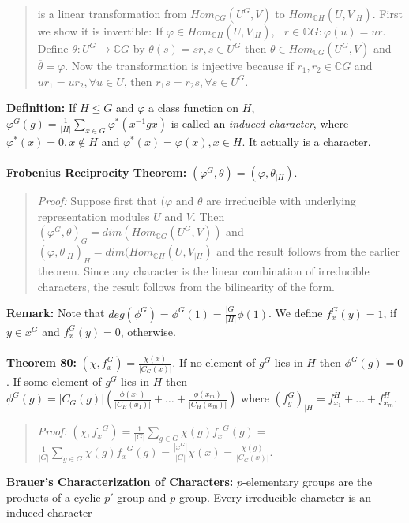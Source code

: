 {\begin{quote}
is a linear transformation from
$ Hom_{{\mathbb C}G}(U^G, V)$ to $Hom_{{\mathbb C}H}(U, V_{|H})$.  First we show it
is invertible: 
If $\varphi \in Hom_{{\mathbb C}H}(U, V_{|H})$,
$\exists r \in {\mathbb C}G: \varphi(u)= ur$.  Define $\theta: U^G \rightarrow {\mathbb C}G$
by $\theta(s)= sr, s \in U^G$ then
$\theta \in Hom_{{\mathbb C}G}(U^G, V) $ and ${\overline \theta}= \varphi$.  Now
the transformation is injective because if
$r_1 , r_2 \in {\mathbb C}G$ and  $u r_1 = u r_2, \forall u \in U$, then
$r_1 s = r_2 s, \forall s \in U^G$.
\end{quote}
{\bf Definition:}
If $H \le G$ and $\varphi$ a class function on $H$, 
$\varphi^G(g)= {\frac 1 {|H|}} \sum_{x \in G} \varphi^* (x^{-1}gx)$ is called an
\emph{induced character}, where $\varphi^*(x)= 0, x \notin H$ and
$\varphi^*(x)= \varphi(x), x \in H$.  It actually is a character.
\\
\\
{\bf Frobenius Reciprocity Theorem:} 
$(\varphi^G , \theta)= (\varphi, \theta_{|H})$.
\begin{quote}
\emph{Proof:}  
Suppose first that 
$(\varphi$ and $\theta$ are irreducible with underlying representation modules
$U$ and $V$.  Then
$(\varphi^G , \theta)_G = dim(Hom_{{\mathbb C}G}(U^G, V))$ and
$(\varphi , \theta_{|H})_H = dim(Hom_{{\mathbb C}H}(U, V_{|H})$ and the result follows from
the earlier theorem.  Since any character is the linear combination of irreducible characters,
the result follows from the bilinearity of the form.
\end{quote}
{\bf Remark:}  Note that $deg(\phi^G)= \phi^G(1)= {\frac {|G|} {|H|}} \phi(1)$.
We define  $f^G_x(y) = 1$, if $y \in x^G$ and
$f^G_x(y) = 0$, otherwise.
\\
\\
{\bf Theorem 80:}
$(\chi, f^G_x) = {\frac {\chi(x)} {|C_G(x)|}}$.
If no element of $g^G$ lies in $H$ then $\phi^G(g)= 0$.
If some element of $g^G$ lies in $H$ then 
$\phi^G(g)= 
|C_G(g)|(
{\frac {\phi(x_1 )} {|C_H(x_1)|}} + \ldots +
{\frac {\phi(x_m )} {|C_H(x_m)|}} ) $ where $(f^G_g)_{|H}= 
f^H_{x_1} + \ldots +
f^H_{x_m}$.
\begin{quote}
\emph{Proof:}  
$(\chi , {f_x}^G) = {\frac 1 {|G|}} \sum_{g \in G} \chi(g) {f_x}^G(g)= $
${\frac 1 {|G|}} \sum_{g \in G} \chi(g) {f_x}^G(g)= {\frac {|x^G|} {|G|}} \chi(x) = {\frac {\chi(g)} {|C_G(x)|}}$.
\end{quote}
{\bf Brauer's Characterization of Characters:} $p$-elementary groups are the products of
a cyclic $p'$ group and $p$ group.  Every irreducible character is an induced character
}
